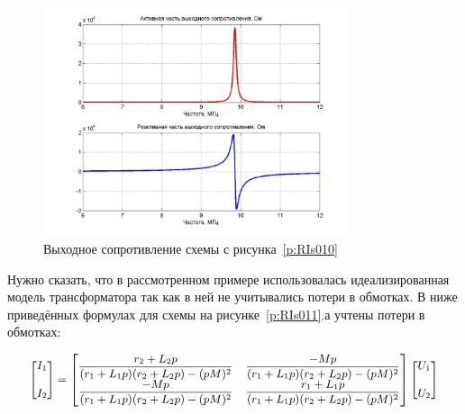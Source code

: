 \begin{figure}[H] \centering
  \includegraphics[width=0.8\textwidth]{./content/RIs013.jpg}
  \caption{Выходное сопротивление схемы с рисунка~\ref{p:RIs010}} \label{p:RIs013}
\end{figure}



Нужно  сказать,  что  в  рассмотренном  примере  использовалась идеализированная  модель  трансформатора  так  как  в  ней  не  учитывались потери в обмотках. В ниже приведённых формулах для схемы на рисунке~\ref{p:RIs011}.а учтены потери в обмотках:  


\begin{equation}
\label{eq:12}
\small
\begin{aligned}
\begin{bmatrix} I_{1}\\ \\ I_{2} \end{bmatrix}= 
\begin{bmatrix} \dfrac{r_{2} + L_{2} p}{(r_{1} + L_{1} p) (r_{2} + L_{2} p) - (p M)^{2}} &
                           \dfrac{-M p}{(r_{1} + L_{1} p) (r_{2} + L_{2} p) - (p M)^{2}}\\ 
						      \dfrac{-M p}{(r_{1} + L_{1} p) (r_{2} + L_{2} p) - (p M)^{2}} &
							  \dfrac{r_{1} + L_{1} p}{(r_{1} + L_{1} p) (r_{2} + L_{2} p) - (p M)^{2}}
\end{bmatrix}
 \begin{bmatrix} U_{1}\\ \\  U_{2} \end{bmatrix}
\end{aligned}
\normalsize
\end{equation}



